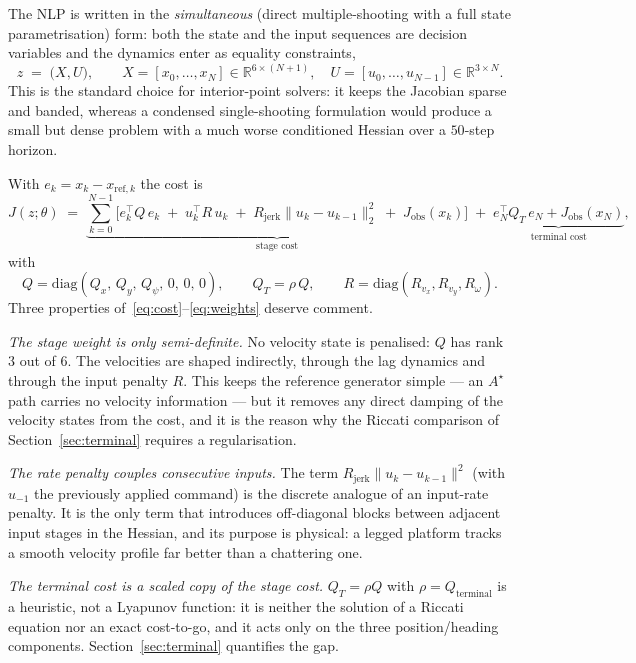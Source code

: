 \documentclass[11pt,a4paper]{article}
\newcommand{\R}{\mathbb{R}}
\newcommand{\astar}{$A^\star$}
\newcommand{\Jobs}{J_{\mathrm{obs}}}
\newcommand{\Rjerk}{R_{\mathrm{jerk}}}
\begin{document}
The NLP is written in the \emph{simultaneous} (direct multiple-shooting with a full state parametrisation)
form: both the state and the input sequences are decision variables and the dynamics enter as equality
constraints,
\begin{equation}
  z \;=\; \big(X,U\big),\qquad X=[x_0,\dots,x_N]\in\R^{6\times(N+1)},\quad U=[u_0,\dots,u_{N-1}]\in\R^{3\times N}.
\end{equation}
This is the standard choice for interior-point solvers: it keeps the Jacobian sparse and banded, whereas a
condensed single-shooting formulation would produce a small but dense problem with a much worse conditioned
Hessian over a $50$-step horizon.

With $e_k=x_k-x_{\mathrm{ref},k}$ the cost is
\begin{equation}
  J(z;\theta) \;=\;
  \underbrace{\sum_{k=0}^{N-1}\Big[e_k^{\!\top} Q\, e_k
  \;+\; u_k^{\!\top} R\, u_k
  \;+\; \Rjerk\|u_k-u_{k-1}\|_2^2
  \;+\; \Jobs(x_k)\Big]}_{\text{stage cost}}
  \;+\;\underbrace{e_N^{\!\top} Q_T\, e_N + \Jobs(x_N)}_{\text{terminal cost}},
  \label{eq:cost}
\end{equation}
with
\begin{equation}
  Q=\mathrm{diag}(Q_x,\,Q_y,\,Q_\psi,\,0,\,0,\,0),\qquad
  Q_T=\rho\,Q,\qquad
  R=\mathrm{diag}(R_{v_x},R_{v_y},R_\omega).
  \label{eq:weights}
\end{equation}
Three properties of~\eqref{eq:cost}--\eqref{eq:weights} deserve comment.

\emph{The stage weight is only semi-definite.} No velocity state is penalised: $Q$ has rank $3$ out of $6$.
The velocities are shaped indirectly, through the lag dynamics and through the input penalty $R$. This keeps
the reference generator simple --- an \astar{} path carries no velocity information --- but it removes any
direct damping of the velocity states from the cost, and it is the reason why the Riccati comparison of
Section~\ref{sec:terminal} requires a regularisation.

\emph{The rate penalty couples consecutive inputs.} The term $\Rjerk\|u_k-u_{k-1}\|^2$ (with $u_{-1}$ the
previously applied command) is the discrete analogue of an input-rate penalty. It is the only term that
introduces off-diagonal blocks between adjacent input stages in the Hessian, and its purpose is physical: a
legged platform tracks a smooth velocity profile far better than a chattering one.

\emph{The terminal cost is a scaled copy of the stage cost.} $Q_T=\rho Q$ with $\rho=Q_{\mathrm{terminal}}$ is
a heuristic, not a Lyapunov function: it is neither the solution of a Riccati equation nor an exact
cost-to-go, and it acts only on the three position/heading components. Section~\ref{sec:terminal} quantifies
the gap.
\end{document}
